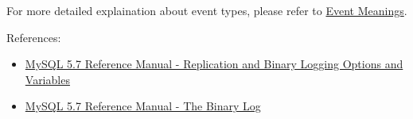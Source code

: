 \documentclass[12pt]{article}
\begin{document}
For more detailed explaination about event types, please refer to \href{https://dev.mysql.com/doc/internals/en/event-meanings.html}{Event Meanings}.

References:

\begin{itemize}
\tightlist
\item
  \href{https://dev.mysql.com/doc/refman/5.7/en/replication-options.html}{MySQL 5.7 Reference Manual - Replication and Binary Logging Options and Variables}
\item
  \href{https://dev.mysql.com/doc/refman/5.7/en/binary-log.html}{MySQL 5.7 Reference Manual - The Binary Log}
\end{itemize}
\end{document}
